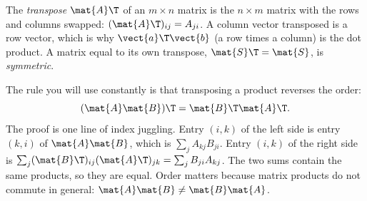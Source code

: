 \begin{definition}[Transpose]
The \emph{transpose} $\mat{A}\T$ of an $m\times n$ matrix is the $n\times m$ matrix with the rows
and columns swapped: $(\mat{A}\T)_{ij} = A_{ji}$. A column vector transposed is a row vector,
which is why $\vect{a}\T\vect{b}$ (a row times a column) is the dot product. A matrix equal to its
own transpose, $\mat{S}\T = \mat{S}$, is \emph{symmetric}.
\end{definition}

The rule you will use constantly is that transposing a product reverses the order:
\begin{equation}\label{eq:linalg:abt}
(\mat{A}\mat{B})\T = \mat{B}\T\mat{A}\T .
\end{equation}
The proof is one line of index juggling. Entry $(i,k)$ of the left side is entry $(k,i)$ of
$\mat{A}\mat{B}$, which is $\sum_j A_{kj}B_{ji}$. Entry $(i,k)$ of the right side is
$\sum_j (\mat{B}\T)_{ij}(\mat{A}\T)_{jk} = \sum_j B_{ji}A_{kj}$. The two sums contain the same
products, so they are equal. Order matters because matrix products do not commute in general:
$\mat{A}\mat{B} \neq \mat{B}\mat{A}$.

